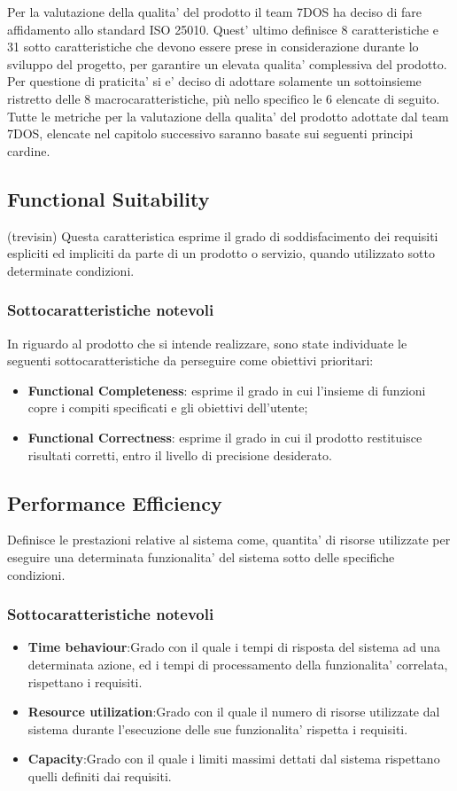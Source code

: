 Per la valutazione della qualita' del prodotto il team 7DOS ha deciso di fare affidamento allo standard ISO 25010.
Quest' ultimo definisce 8 caratteristiche e 31 sotto caratteristiche che devono essere prese in considerazione durante lo sviluppo del progetto, per garantire un  elevata qualita' complessiva del prodotto.
Per questione di praticita' si e' deciso di adottare solamente un sottoinsieme ristretto delle 8 macrocaratteristiche, più nello specifico le 6 elencate di seguito.
Tutte le metriche per la valutazione della qualita' del prodotto adottate dal team 7DOS, elencate nel capitolo successivo saranno basate sui seguenti principi cardine.
\subsection{Functional Suitability} (trevisin)
Questa caratteristica esprime il grado di soddisfacimento dei requisiti espliciti ed impliciti da parte di un prodotto o servizio, quando utilizzato sotto determinate condizioni.
\subsubsection{Sottocaratteristiche notevoli}
In riguardo al prodotto che si intende realizzare, sono state individuate le seguenti sottocaratteristiche da perseguire come obiettivi prioritari: 
\begin{itemize}
	\item{\textbf{Functional Completeness}}: esprime il grado in cui l'insieme di funzioni copre i compiti specificati e gli obiettivi dell'utente;
	\item{\textbf{Functional Correctness}}: esprime il grado in cui il prodotto restituisce risultati corretti, entro il livello di precisione desiderato.
\end{itemize}

\subsection{Performance Efficiency}
Definisce le prestazioni relative al sistema come, quantita' di risorse utilizzate per eseguire una determinata funzionalita' del sistema sotto delle specifiche condizioni. 
\subsubsection{Sottocaratteristiche notevoli}
\begin{itemize}
	\item{\textbf{Time behaviour}}:Grado con il quale i tempi di risposta del sistema ad una determinata azione, ed i tempi di processamento della funzionalita' correlata, rispettano i requisiti.
	\item{\textbf{Resource utilization}}:Grado con il quale il numero di risorse utilizzate dal sistema durante l'esecuzione delle sue funzionalita' rispetta i requisiti.
	\item{\textbf{Capacity}}:Grado con il quale i limiti massimi dettati dal sistema rispettano quelli definiti dai requisiti.
\end{itemize}

